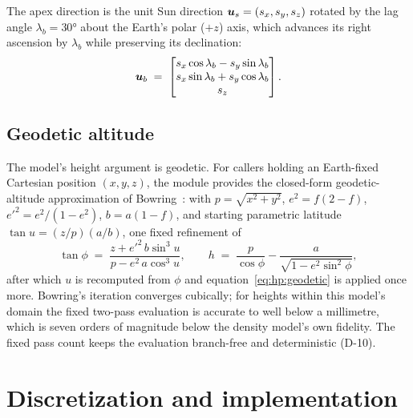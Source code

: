 The apex direction is the unit Sun direction $\bm{u}_s = (s_x, s_y, s_z)$
rotated by the lag angle $\lambda_b = \ang{30}$ about the Earth's polar
($+z$) axis, which advances its right ascension by $\lambda_b$ while
preserving its declination:
\begin{equation}
  \bm{u}_b \;=\;
  \begin{bmatrix}
    s_x \cos\lambda_b - s_y \sin\lambda_b \\
    s_x \sin\lambda_b + s_y \cos\lambda_b \\
    s_z
  \end{bmatrix}.
  \label{eq:hp:apex}
\end{equation}

\subsection{Geodetic altitude}

The model's height argument is geodetic. For callers holding an
Earth-fixed Cartesian position $(x, y, z)$, the module provides the
closed-form geodetic-altitude approximation of
Bowring~\cite{bowring1976}: with $p = \sqrt{x^2 + y^2}$,
$e^2 = f(2-f)$, $e'^2 = e^2/(1-e^2)$, $b = a(1-f)$, and starting parametric
latitude $\tan u = (z/p)(a/b)$, one fixed refinement of
\begin{equation}
  \tan\phi \;=\; \frac{z + e'^2\, b \sin^3 u}{p - e^2\, a \cos^3 u},
  \qquad
  h \;=\; \frac{p}{\cos\phi} - \frac{a}{\sqrt{1 - e^2 \sin^2\phi}},
  \label{eq:hp:geodetic}
\end{equation}
after which $u$ is recomputed from $\phi$ and
equation~\eqref{eq:hp:geodetic} is applied once more. Bowring's iteration
converges cubically; for heights within this model's domain the fixed
two-pass evaluation is accurate to well below a millimetre, which is seven
orders of magnitude below the density model's own fidelity. The fixed pass
count keeps the evaluation branch-free and deterministic (D-10).

\section{Discretization and implementation}
\label{sec:hp:implementation}

